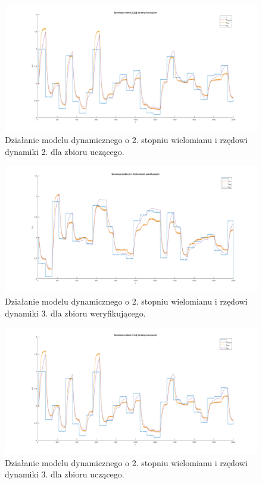 \begin{figure}[H]
\centering
\includegraphics[width=16cm,trim={5cm 1cm 5cm 1cm},clip]{images/d10.png}
\caption{Działanie modelu dynamicznego o 2. stopniu wielomianu i rzędowi dynamiki 2. dla zbioru uczącego.}
\label{fig:d10}
\end{figure}
\begin{figure}[H]
\centering
\includegraphics[width=16cm,trim={5cm 1cm 5cm 1cm},clip]{images/d11.png}
\caption{Działanie modelu dynamicznego o 2. stopniu wielomianu i rzędowi dynamiki 3. dla zbioru weryfikującego.}
\label{fig:d11}
\end{figure}
\begin{figure}[H]
\centering
\includegraphics[width=16cm,trim={5cm 1cm 5cm 1cm},clip]{images/d12.png}
\caption{Działanie modelu dynamicznego o 2. stopniu wielomianu i rzędowi dynamiki 3. dla zbioru uczącego.}
\label{fig:d12}
\end{figure}

